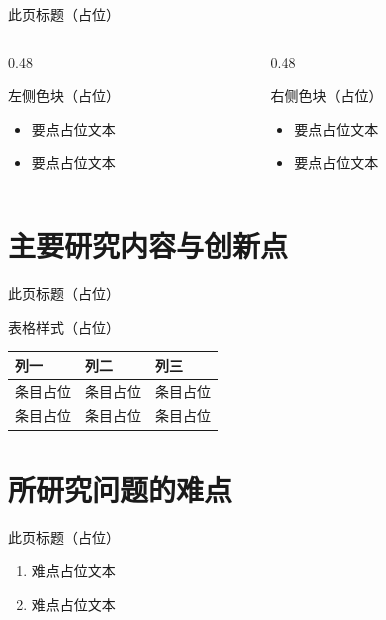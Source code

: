 \documentclass[aspectratio=169,11pt]{beamer}
\begin{document}
\begin{frame}{此页标题（占位）}
  \begin{columns}[T]
    \begin{column}{0.48\textwidth}
      \begin{exampleblock}{左侧色块（占位）}
        \begin{itemize}
          \item 要点占位文本
          \item 要点占位文本
        \end{itemize}
      \end{exampleblock}
    \end{column}
    \begin{column}{0.48\textwidth}
      \begin{alertblock}{右侧色块（占位）}
        \begin{itemize}
          \item 要点占位文本
          \item 要点占位文本
        \end{itemize}
      \end{alertblock}
    \end{column}
  \end{columns}
\end{frame}

\section{主要研究内容与创新点}

\begin{frame}{此页标题（占位）}
  \begin{block}{表格样式（占位）}
    \centering
    \begin{tabular}{lll}
      \toprule
      列一 & 列二 & 列三 \\
      \midrule
      条目占位 & 条目占位 & 条目占位 \\
      条目占位 & 条目占位 & 条目占位 \\
      \bottomrule
    \end{tabular}
  \end{block}
  \vskip2mm
  \begin{center}
  \end{center}
\end{frame}

\section{所研究问题的难点}

\begin{frame}{此页标题（占位）}
  \begin{enumerate}
    \item 难点占位文本
    \item 难点占位文本
  \end{enumerate}
\end{frame}
\end{document}
